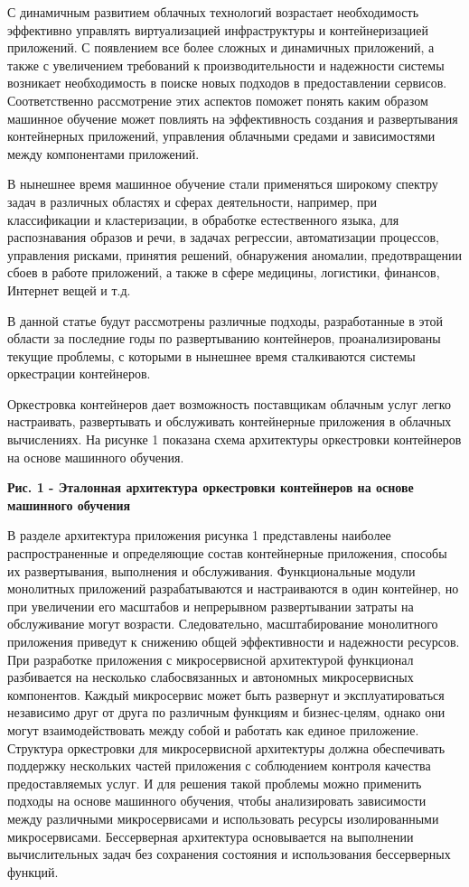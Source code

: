 С динамичным развитием облачных технологий возрастает необходимость
эффективно управлять виртуализацией инфраструктуры и контейнеризацией
приложений. С появлением все более сложных и динамичных приложений, а
также с увеличением требований к производительности и надежности системы
возникает необходимость в поиске новых подходов в предоставлении
сервисов. Соответственно рассмотрение этих аспектов поможет понять каким
образом машинное обучение может повлиять на эффективность создания и
развертывания контейнерных приложений, управления облачными средами и
зависимостями между компонентами приложений.

В нынешнее время машинное обучение стали применяться широкому спектру
задач в различных областях и сферах деятельности, например, при
классификации и кластеризации, в обработке естественного языка, для
распознавания образов и речи, в задачах регрессии, автоматизации
процессов, управления рисками, принятия решений, обнаружения аномалии,
предотвращении сбоев в работе приложений, а также в сфере медицины,
логистики, финансов, Интернет вещей и т.д.

В данной статье будут рассмотрены различные подходы, разработанные в
этой области за последние годы по развертыванию контейнеров,
проанализированы текущие проблемы, с которыми в нынешнее время
сталкиваются системы оркестрации контейнеров.

Оркестровка контейнеров дает возможность поставщикам облачным услуг
легко настраивать, развертывать и обслуживать контейнерные приложения в
облачных вычислениях. На рисунке 1 показана схема архитектуры
оркестровки контейнеров на основе машинного обучения.

{\bfseries Рис. 1 - Эталонная архитектура оркестровки контейнеров на основе
машинного обучения}

В разделе архитектура приложения рисунка 1 представлены наиболее
распространенные и определяющие состав контейнерные приложения, способы
их развертывания, выполнения и обслуживания. Функциональные модули
монолитных приложений разрабатываются и настраиваются в один контейнер,
но при увеличении его масштабов и непрерывном развертывании затраты на
обслуживание могут возрасти. Следовательно, масштабирование монолитного
приложения приведут к снижению общей эффективности и надежности
ресурсов. При разработке приложения с микросервисной архитектурой
функционал разбивается на несколько слабосвязанных и автономных
микросервисных компонентов. Каждый микросервис может быть развернут и
эксплуатироваться независимо друг от друга по различным функциям и
бизнес-целям, однако они могут взаимодействовать между собой и работать
как единое приложение. Структура оркестровки для микросервисной
архитектуры должна обеспечивать поддержку нескольких частей приложения с
соблюдением контроля качества предоставляемых услуг. И для решения такой
проблемы можно применить подходы на основе машинного обучения, чтобы
анализировать зависимости между различными микросервисами и использовать
ресурсы изолированными микросервисами. Бессерверная архитектура
основывается на выполнении вычислительных задач без сохранения состояния
и использования бессерверных функций.

